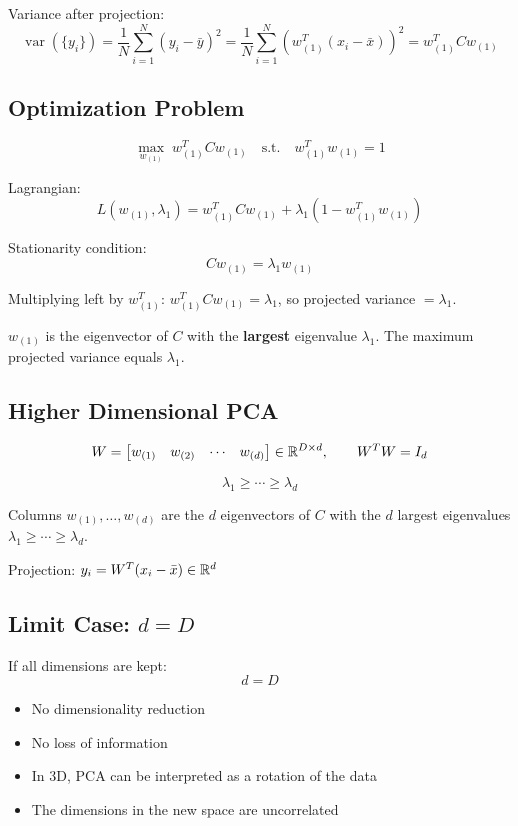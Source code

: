 \documentclass[11pt,a4paper,openany]{book}
\begin{document}
Variance after projection:
\[
\operatorname{var}(\{y_i\})
= \frac{1}{N}\sum_{i=1}^{N}(y_i-\bar{y})^2
= \frac{1}{N}\sum_{i=1}^{N}\left(w_{(1)}^T(x_i-\bar{x})\right)^2
= w_{(1)}^T C w_{(1)}
\]

\subsection{Optimization Problem}

\[
\max_{w_{(1)}} \; w_{(1)}^T C w_{(1)}
\quad \text{s.t.} \quad w_{(1)}^T w_{(1)} = 1
\]

Lagrangian:
\[
L(w_{(1)}, \lambda_1)
= w_{(1)}^T C w_{(1)} + \lambda_1\!\left(1 - w_{(1)}^T w_{(1)}\right)
\]

Stationarity condition:
\[
Cw_{(1)} = \lambda_1 w_{(1)}
\]

Multiplying left by \(w_{(1)}^T\): \quad \(w_{(1)}^T C w_{(1)} = \lambda_1\), so projected variance \(= \lambda_1\).

\begin{propbox}[title=1D PCA Solution]
\(w_{(1)}\) is the eigenvector of \(C\) with the \textbf{largest} eigenvalue \(\lambda_1\). The maximum projected variance equals \(\lambda_1\).
\end{propbox}

\subsection{Higher Dimensional PCA}

\[
W =
\begin{bmatrix}
w_{(1)} & w_{(2)} & \cdots & w_{(d)}
\end{bmatrix}
\in \mathbb{R}^{D \times d},
\qquad
W^T W = I_d
\]

\[
\lambda_1 \ge \cdots \ge \lambda_d
\]

Columns \(w_{(1)}, \ldots, w_{(d)}\) are the \(d\) eigenvectors of \(C\) with the \(d\) largest eigenvalues \(\lambda_1 \ge \cdots \ge \lambda_d\).

Projection: \(y_i = W^T(x_i - \bar{x}) \in \mathbb{R}^d\)

\subsection{Limit Case: \texorpdfstring{\(d = D\)}{d = D}}

\begin{rembox}[title=No dimensionality reduction]
If all dimensions are kept:
\[
d = D
\]

\begin{itemize}
    \item No dimensionality reduction
    \item No loss of information
    \item In 3D, PCA can be interpreted as a rotation of the data
    \item The dimensions in the new space are uncorrelated
\end{itemize}
\end{rembox}
\end{document}
